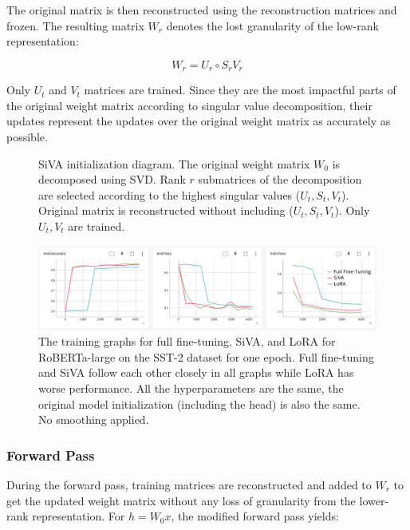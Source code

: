 The original matrix is then reconstructed using the reconstruction matrices and frozen. The resulting matrix \(W_r\) denotes the lost granularity of the low-rank representation:

\begin{equation}
    W_r = U_r \circ S_r V_r
\end{equation}

Only \(U_t\) and \(V_t\) matrices are trained. Since they are the most impactful parts of the original weight matrix according to singular value decomposition, their updates represent the updates over the original weight matrix as accurately as possible. 

\begin{figure}[t]
    \centering
    
    \caption{SiVA initialization diagram. The original weight matrix \(W_0\) is decomposed using SVD. Rank \(r\) submatrices of the decomposition are selected according to the highest singular values (\(U_t, S_t, V_t\)). Original matrix is reconstructed without including (\(U_t, S_t, V_t\)). Only \(U_t, V_t\) are trained. }
    \label{siva-init}
\end{figure}

\begin{figure}[htb]
    \centering
    \includegraphics[width=\textwidth]{assets/images/siva-lora-training.png}
    \caption{The training graphs for full fine-tuning, SiVA, and LoRA for RoBERTa-large \cite{roberta} on the SST-2 \cite{wang2019glue} dataset for one epoch. Full fine-tuning and SiVA follow each other closely in all graphs while LoRA has worse performance. All the hyperparameters are the same, the original model initialization (including the head) is also the same. No smoothing applied.}
    \label{siva-lora-training}
\end{figure}

\subsubsection{Forward Pass}
During the forward pass, training matrices are reconstructed and added to \(W_r\) to get the updated weight matrix without any loss of granularity from the lower-rank representation. For \(h = W_0 x\), the modified forward pass yields:

